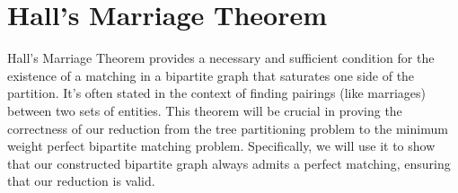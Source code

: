 \begin{comment}
\begin{proof}
    We have the following expression for the determinant, \draft{also called Leibniz formula}:

    $$
    \text{Det}(M) = \sum_{\pi \in S_n} (-1)^{sgn(\pi)} \prod_{i=1}^{n} M_{i,\pi(i)}
    $$
    \alessio{Cosa ritorna sgn? 0 o 1? In caso puoi fargli ritornare -1 e 1 e non ti serve l'esponente.}

    where $S_n$ is the set of all permutations on $[n]$, and $sgn(\pi)$ is the sign of the permutation $\pi$. \alessio{Definisci il segno di una permutazione. Prima indicavi le permutazioni con $\Pi$, ora con $\pi$. Immagino che sia per la moltiplicatoria, valuta se usare $\pi$ anche prima.}
    There is a one-to-one correspondence between a permutation $\pi \in S_n$ and a (possible) perfect matching 

    $$
    \{(u_1, v_{\pi(1)}), (u_2, v_{\pi(2)}), \cdots , (u_n, v_{\pi(n)})\} \text{ in } G.
    $$

    Note that if this perfect matching does not exist in $G$ (i.e., some edge $(u_i, v_{\pi(i)}) \notin E$), then the term corresponding to $\pi$ in the summation is $0$. So we have

    $$
    \text{Det}(M) = \sum_{\pi \in P} (-1)^{sgn(\pi)} \prod_{i=1}^{n} x_{i,\pi(i)}
    $$

    where $P$ is the set of perfect matchings in $G$. This is zero if $P = \emptyset$, i.e., if $G$ has no perfect matching. If $G$ has a perfect matching, there is \draft{at least} a $\pi \in P$ and the term corresponding to $\pi$ is

    $$
    \prod_{i=1}^{n} x_{i,\pi(i)} \neq 0.
    $$

    Additionally, there is no other term in the summation that contains the same set of variables. Therefore, this term is not cancelled by any other term. So in this case, $\text{Det}(M) \neq 0$.
\end{proof}
\end{comment}

\section{Hall's Marriage Theorem}
Hall's Marriage Theorem \cite{hall1935representatives} provides a necessary and sufficient condition for the existence of a matching in a bipartite graph that saturates one side of the partition. It's often stated in the context of finding pairings (like marriages) between two sets of entities. This theorem will be crucial in proving the correctness of our reduction from the tree partitioning problem to the minimum weight perfect bipartite matching problem. Specifically, we will use it to show that our constructed bipartite graph always admits a perfect matching, ensuring that our reduction is valid.
    
